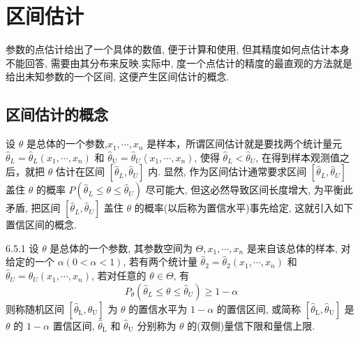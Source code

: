 \section{区间估计}\label{sec:6.5}

参数的点估计给出了一个具体的数值, 便于计算和使用, 但其精度如何点估计本身不能回答, 需要由其分布来反映.实际中, 度一个点估计的精度的最直观的方法就是给出未知参数的一个区间, 这便产生区间估计的概念.

\subsection{区间估计的概念}\label{ssec:6.5.1}

设 $\theta$ 是总体的一个参数,$x_{1}, \cdots, x_{n}$ 是样本，所谓区间估计就是要找两个统计量元 $\hat{\theta}_{L}=\hat{\theta}_{L}\left(x_{1}, \cdots, x_{n}\right)$ 和 $\hat{\theta}_{\mathrm{U}}=\hat{\theta}_{U}\left\langle x_{1}, \cdots, x_{n}\right)$, 使得 $\hat{\theta}_{L}<\hat{\theta}_{U}$, 在得到样本观测值之后，就把 $\theta$ 估计在区间 $\left[\hat{\theta}_{L}, \hat{\theta}_{U}\right]$ 内. 显然, 作为区间估计通常要求区间 $\left[\hat{\theta}_{L}, \hat{\theta}_{U}\right]$
盖住 $\theta$ 的概率 $P(\hat{\theta}_{L} \leqslant \theta \leqslant \hat{\theta}_{U})$ 尽可能大, 但这必然导致区间长度增大, 为平衡此矛盾, 把区间 $\left[\hat{\theta}_{L}, \hat{\theta}_{U}\right]$ 盖住 $\theta$ 的概率(以后称为置信水平)事先给定, 这就引入如下置信区间的概念.

\begin{definition}{}{6.5.1}
设 $\theta$ 是总体的一个参数, 其参数空间为 $\Theta, x_{1}, \cdots, x_{n}$ 是来自该总体的样本, 对给定的一个 $\alpha(0<\alpha<1)$, 若有两个统计量 $\hat{\theta}_{2}=\hat{\theta}_{2}\left(x_{1}, \cdots, x_{n}\right)$ 和 $\hat{\theta}_{U}=\hat{\theta}_{U}\left(x_{1}, \cdots, x_{n}\right)$, 若对任意的 $\theta \in \Theta$, 有
\begin{equation}\label{eq:6.5.1}
P_{\theta}\left(\hat{\theta}_{L} \leqslant \theta \leqslant \hat{\theta}_{U}\right) \geqslant 1-\alpha
\end{equation}
则称随机区间 $\left[\hat{\theta}_{\mathrm{L}}, \hat{\theta}_{\mathrm{U}}\right]$ 为 $\theta$ 的{\heiti 置信水平}为 $1-\alpha$ 的{\heiti 置信区间}, 或简称 $\left[\hat{\theta}_{\mathrm{L}}, \hat{\theta}_{\mathrm{U}}\right]$ 是 $\theta$ 的 $1-\alpha$ {\heiti 置信区间}, $\hat{\theta}_{\mathrm{L}}$ 和 $\hat{\theta}_{\mathrm{U}}$ 分别称为 $\theta$ 的(双侧){\heiti 量信下限}和{\heiti 量信上限}.
\end{definition}

